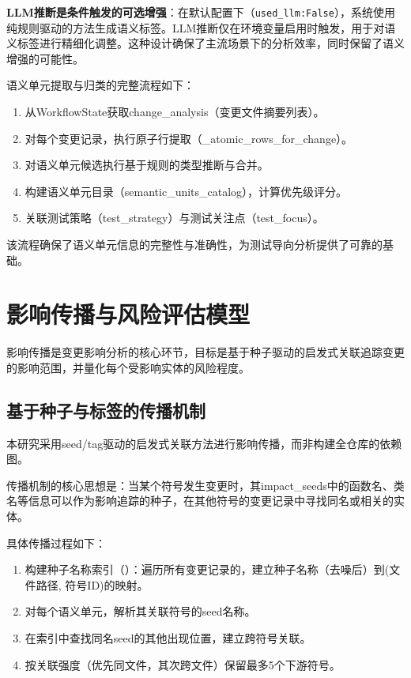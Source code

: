\textbf{LLM推断是条件触发的可选增强}：在默认配置下（\texttt{used\_llm:\allowbreak False}），系统使用纯规则驱动的方法生成语义标签。LLM推断仅在环境变量启用时触发，用于对语义标签进行精细化调整。这种设计确保了主流场景下的分析效率，同时保留了语义增强的可能性。

语义单元提取与归类的完整流程如下：

\begin{enumerate}
    \item 从WorkflowState获取change\_analysis（变更文件摘要列表）。
    \item 对每个变更记录，执行原子行提取（\_atomic\_rows\_for\_change）。
    \item 对语义单元候选执行基于规则的类型推断与合并。
    \item 构建语义单元目录（semantic\_units\_catalog），计算优先级评分。
    \item 关联测试策略（test\_strategy）与测试关注点（test\_focus）。
\end{enumerate}

该流程确保了语义单元信息的完整性与准确性，为测试导向分析提供了可靠的基础。

\section{影响传播与风险评估模型}

影响传播是变更影响分析的核心环节，目标是基于种子驱动的启发式关联追踪变更的影响范围，并量化每个受影响实体的风险程度。

\subsection{基于种子与标签的传播机制}
本研究采用seed/tag驱动的启发式关联方法进行影响传播，而非构建全仓库的依赖图。

传播机制的核心思想是：当某个符号发生变更时，其impact\_seeds中的函数名、类名等信息可以作为影响追踪的种子，在其他符号的变更记录中寻找同名或相关的实体。

具体传播过程如下：

\begin{enumerate}
    \item 构建种子名称索引（）：遍历所有变更记录的，建立种子名称（去噪后）到(文件路径, 符号ID)的映射。
    \item 对每个语义单元，解析其关联符号的seed名称。
    \item 在索引中查找同名seed的其他出现位置，建立跨符号关联。
    \item 按关联强度（优先同文件，其次跨文件）保留最多5个下游符号。
\end{enumerate}

